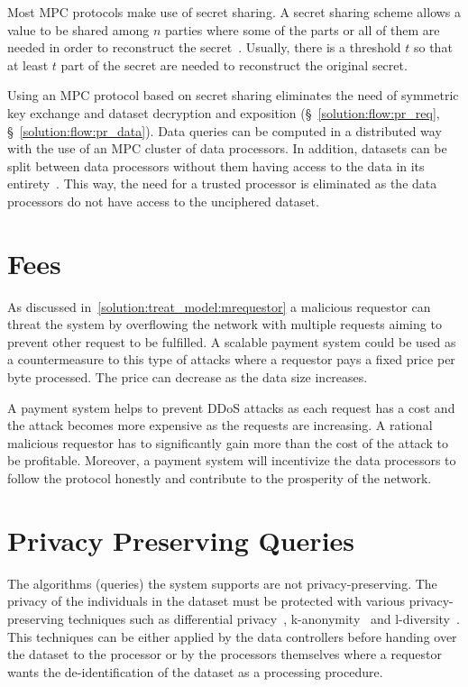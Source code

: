 Most MPC protocols make use of secret sharing. A secret sharing scheme allows a value to be shared among $n$ parties where some of the parts or all of them are needed in order to reconstruct the secret~\cite{Kamm:2015:ASM:2836836}. Usually, there is a threshold $t$ so that at least $t$ part of the secret are needed to reconstruct the original secret.

Using an MPC protocol based on secret sharing eliminates the need of symmetric key exchange and dataset decryption and exposition (§~\ref{solution:flow:pr_req}, §~\ref{solution:flow:pr_data}). Data queries can be computed in a distributed way with the use of an MPC cluster of data processors. In addition, datasets can be split between data processors without them having access to the data in its entirety~\cite{DBLP:journals/corr/ZyskindNP15}. This way, the need for a trusted processor is eliminated as the data processors do not have access to the unciphered dataset.

\section{Fees}
\label{future_work:fees}

As discussed in~\ref{solution:treat_model:mrequestor} a malicious requestor can threat the system by overflowing the network with multiple requests aiming to prevent other request to be fulfilled. A scalable payment system could be used as a countermeasure to this type of attacks where a requestor pays a fixed price per byte processed. The price can decrease as the data size increases.

A payment system helps to prevent DDoS attacks as each request has a cost and the attack becomes more expensive as the requests are increasing. A rational malicious requestor has to significantly gain more than the cost of the attack to be profitable. Moreover, a payment system will incentivize the data processors to follow the protocol honestly and contribute to the prosperity of the network.

\section{Privacy Preserving Queries}
\label{future_work:ppq}

The algorithms (queries) the system supports are not privacy-preserving. The privacy of the individuals in the dataset must be protected with various privacy-preserving techniques such as differential privacy~\cite{differential_privacy}, k-anonymity~\cite{Samarati98protectingprivacy} and l-diversity~\cite{Aggarwal2008}. This techniques can be either applied by the data controllers before handing over the dataset to the processor or by the processors themselves where a requestor wants the de-identification of the dataset as a processing procedure.

